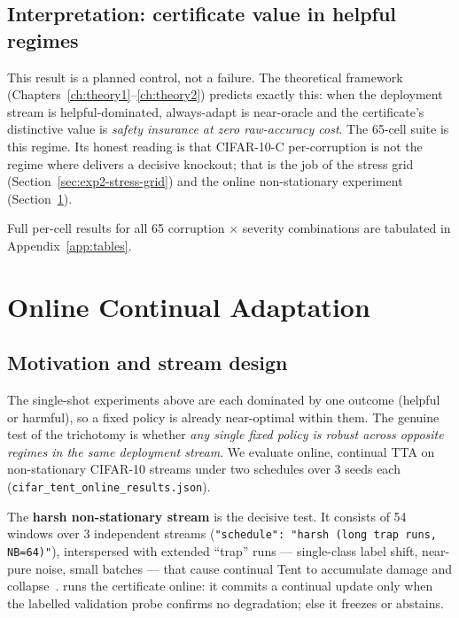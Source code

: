 \subsection{Interpretation: certificate value in helpful regimes}\label{sec:exp2-c10c-interp}

This result is a planned control, not a failure.  The theoretical framework
(Chapters~\ref{ch:theory1}--\ref{ch:theory2}) predicts exactly this: when the
deployment stream is helpful-dominated, always-adapt is near-oracle and the
certificate's distinctive value is \emph{safety insurance at zero raw-accuracy cost}.
The 65-cell suite is this regime.  Its honest reading is that CIFAR-10-C
per-corruption is not the regime where \KGA{} delivers a decisive knockout; that is
the job of the stress grid (Section~\ref{sec:exp2-stress-grid}) and the online
non-stationary experiment (Section~\ref{sec:exp2-online}).

Full per-cell results for all 65 corruption $\times$ severity combinations are
tabulated in Appendix~\ref{app:tables}.

\section{Online Continual Adaptation}\label{sec:exp2-online}

\subsection{Motivation and stream design}\label{sec:exp2-online-design}

The single-shot experiments above are each dominated by one outcome (helpful or
harmful), so a fixed policy is already near-optimal within them.  The genuine
test of the trichotomy is whether \emph{any single fixed policy is robust across
opposite regimes in the same deployment stream}.  We evaluate online, continual
TTA on non-stationary CIFAR-10 streams under two schedules over 3 seeds each
(\texttt{cifar\_tent\_online\_results.json}).

The \textbf{harsh non-stationary stream} is the decisive test.  It consists of
54 windows over 3 independent streams (\texttt{"schedule": "harsh (long trap runs,
NB=64)"}), interspersed with extended ``trap'' runs --- single-class label shift,
near-pure noise, small batches --- that cause continual Tent to accumulate
damage and collapse~\cite{press2023rdumb, wang2022cotta, gong2022note}.
\KGA{} runs the certificate online: it commits a continual update only when the
labelled validation probe confirms no degradation; else it freezes or abstains.

